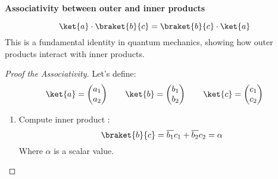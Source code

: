 \highspace
\begin{flushleft}
    \textcolor{Green3}{ \textbf{Associativity between outer and inner products}}
\end{flushleft}
\begin{equation}
    \ket{a} \cdot \braket{b}{c} = \braket{b}{c} \cdot \ket{a}
\end{equation}
This is a fundamental identity in quantum mechanics, showing how outer products interact with inner products.

\begin{proof}[Proof the Associativity]
    Let's define:
    \begin{equation*}
        \ket{a} = \begin{pmatrix}
            a_{1} \\
            a_{2}
        \end{pmatrix}
        \hspace{2em}
        \ket{b} = \begin{pmatrix}
            b_{1} \\
            b_{2}
        \end{pmatrix}
        \hspace{2em}
        \ket{c} = \begin{pmatrix}
            c_{1} \\
            c_{2}
        \end{pmatrix}
    \end{equation*}
    \begin{enumerate}
        \item Compute inner product :
        \begin{equation*}
            \braket{b}{c} = \overline{b_{1}} c_{1} + \overline{b_{2}} c_{2} = \alpha
        \end{equation*}
        Where $\alpha$ is a scalar value.


\end{enumerate}
\end{proof}
